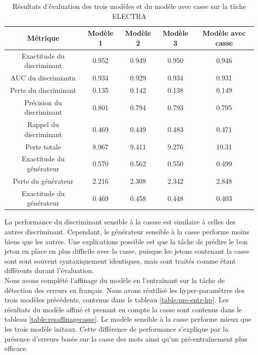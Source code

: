 \documentclass[12pt,twoside,maitrise]{dms}
\theoremstyle{definition}
\numberwithin{equation}{section}
\numberwithin{table}{chapter}
\numberwithin{figure}{chapter}
\begin{document}
\begin{table}[h!]
	\centering
	\begin{tabular}{||c | c c c c||}
		\hline
		Métrique                   & Modèle 1 & Modèle 2 & Modèle 3 & Modèle avec casse \\ [0.5ex]
		\hline\hline
		Exactitude du discriminant & 0.952    & 0.949    & 0.950    & 0.946             \\
		AUC du discrimiantn        & 0.934    & 0.929    & 0.934    & 0.931             \\
		Perte du discriminant      & 0.135    & 0.142    & 0.138    & 0.149             \\
		Précision du discriminant  & 0.801    & 0.794    & 0.793    & 0.795             \\
		Rappel du discriminant     & 0.469    & 0.449    & 0.483    & 0.471             \\
		Perte totale               & 8.967    & 9.411    & 9.276    & 10.31             \\
		Exactitude du générateur   & 0.570    & 0.562    & 0.550    & 0.499             \\
		Perte du générateur        & 2.216    & 2.308    & 2.342    & 2.848             \\
		Exactitude du générateur   & 0.469    & 0.458    & 0.448    & 0.403             \\
		\hline
	\end{tabular}
	\caption{Résultats d'évaluation des trois modèles et du modèle avec casse sur la tâche ELECTRA}
	\label{table:respreentrainementaveccasse}
\end{table}

La performance du discriminant sensible à la cassse est similaire à celles des
autres discriminant. Cependant, le générateur sensible à la casse performe
moins biens que les autres. Une explications possible est que la tâche de
prédire le bon jeton en place en plus difficile avec la casse, puisque les
jetons contenant la casse sont sont souvent syntaxiquement identiques, mais
sont traités comme étant différents durant l'évaluation.\\

Nous avons complété l'affinage du modèle en l'entraînant sur la tâche de
détection des erreurs en français. Nous avons réutilisé les hyper-paramètres
des trois modèles précédents, contenus dans le tableau \ref{table:pre-entr-hp}.
Les résultats du modèle affiné et prenant en compte la casse sont contenus dans
le tableau \ref{table:resaffinagecasse}. Le modèle sensible à la casse performe
mieux que les trois modèle initaux. Cette différence de performance s'explique
par la présence d'erreurs basée sur la casse des mots ainsi qu'un
pré-entraînement plus efficace.
\end{document}
